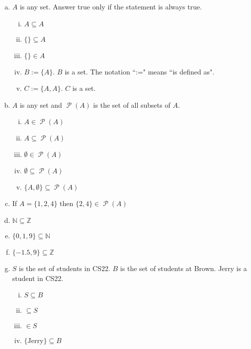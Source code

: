 \documentclass[12pt,letterpaper]{article}
\newcommand\N{\mathbb N}
\newcommand\Z{\mathbb Z}
\newcommand\Pow{\ensuremath{\operatorname{\mathcal{P}}}}
\newif\ifsol
\begin{document}
      \begin{enumerate}[a.]
        \item $A$ is any set. Answer true only if the statement is always true.
          \begin{enumerate}[i.]
            \item $A \subseteq A$ \ifsol  (T)  \fi
            \item $\{\} \subseteq A$\ifsol  (T)  \fi
            \item $\{\} \in A$ \ifsol  (F)  \fi
            \item $B:= \{A\}$. $B$ is a set. The notation ``:=" means ``is defined as". \ifsol  (T)  \fi
            \item $C := \{A, A\}$. $C$ is a set. \ifsol  (F, repition) \fi
		 \end{enumerate}
	  \item $A$ is any set and $\Pow{(A)}$ is the set of all subsets of $A$.
		\begin{enumerate}[i.]
		   \item $A \in \Pow{(A)}$  \ifsol  (T)  \fi
		   \item $A \subseteq \Pow{(A)}$  \ifsol  (F)  \fi
		   \item $\emptyset \in \Pow{(A)}$  \ifsol  (T)  \fi
		   \item $\emptyset \subseteq \Pow{(A)}$  \ifsol  (T)  \fi
		   \item $\{A, \emptyset\} \subseteq \Pow{(A)}$  \ifsol  (T)  \fi
          \end{enumerate}
	  \item If $A = \{1,2,4\}$ then $\{2,4\} \in \Pow{(A)}$  \ifsol  (T)  \fi
        \item $\N \subseteq \Z$  \ifsol  (T)  \fi
        \item $\{0, 1, 9\} \subseteq \N$  \ifsol  (T)  \fi
        \item $\{-1.5, 9\} \subseteq \Z$  \ifsol  (F)  \fi
        \item $S$ is the set of students in CS22. $B$ is the set of students at Brown. Jerry is a student in CS22.
        \begin{enumerate}[i.]
          \item $S \subseteq B$  \ifsol  (T)  \fi
          \item {} $\subseteq S$  \ifsol  (F)  \fi
          \item {} $\in S$  \ifsol  (T)  \fi
          \item $\{\text{Jerry}\} \subseteq B$  \ifsol  (T)  \fi
        \end{enumerate}

\end{enumerate}
\end{document}
